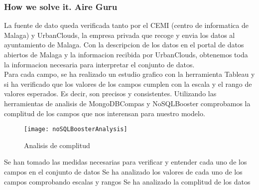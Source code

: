 \subsubsection{How we solve it. Aire Guru} 
La fuente de dato queda verificada tanto por el CEMI (centro de informatica de Malaga) y UrbanClouds, la empresa privada
que recoge y envia los datos al ayuntamiento de Malaga.
Con la descripcion de los datos en el portal de datos abiertos de Malaga y la informacion recibida por UrbanClouds, 
obtenemos toda la informacion necesaria para interpretar el conjunto de datos.\\

Para cada campo, se ha realizado un estudio grafico con la herramienta Tableau y si ha verificado que los valores de los
campos cumplen con la escala y el rango de valores esperados. Es decir, son precisos y consistentes.
Utilizando las herramientas de analisis de MongoDBCompas y NoSQLBooster comprobamos la complitud de los campos que nos
interensan para nuestro modelo.
\begin{figure}[ht]
    \centering
    \texttt{[image: noSQLBoosterAnalysis]}
    \caption{Analisis de complitud}
\end{figure}

\begin{itemize}
    \done Se han tomado las medidas necesarias para verificar y entender cada uno de los campos en el conjunto de datos
    \done Se ha analizado los valores de cada uno de los campos comprobando escalas y rangos
    \done Se ha analizado la complitud de los datos
    
\end{itemize}
 \newpage
